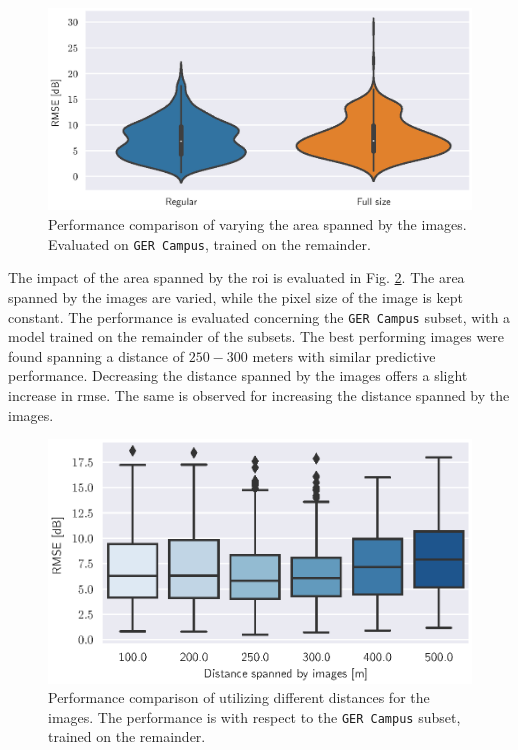 \begin{figure}[h]
    \centering
    \includegraphics{chapters/part_pathloss/osm_images_paper/figures/RMSE_violin.eps}
    \caption{Performance comparison of varying the area spanned by the images. Evaluated on \texttt{GER Campus}, trained on the remainder.}
    \label{fig:rmse_violin_image_comparison}
\end{figure}


The impact of the area spanned by the \gls{roi} is evaluated in Fig. \ref{fig:boxplot_ci_image_distance}. The area spanned by the images are varied, while the pixel size of the image is kept constant. The performance is evaluated concerning the \texttt{GER Campus} subset, with a model trained on the remainder of the subsets. The best performing images were found spanning a distance of $250-300$ meters with similar predictive performance. Decreasing the distance spanned by the images offers a slight increase in \gls{rmse}. The same is observed for increasing the distance spanned by the images.

\begin{figure}
    \centering
    \includegraphics{chapters/part_pathloss/osm_images_paper/figures/boxplot_ci_image_distance.eps}
    \caption{Performance comparison of utilizing different distances for the images. The performance is with respect to the \texttt{GER Campus} subset, trained on the remainder.}
    \label{fig:boxplot_ci_image_distance}
\end{figure}

